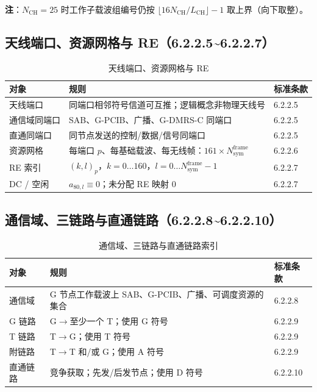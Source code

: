 \documentclass[11pt,a4paper]{ctexart}
\begin{document}
\textbf{注}：$N_{\mathrm{CH}}=25$ 时工作子载波组编号仍按 $\lfloor 16 N_{\mathrm{CH}}/L_{\mathrm{CH}} \rfloor - 1$ 取上界（向下取整）。

\subsection{天线端口、资源网格与 RE（6.2.2.5\textasciitilde 6.2.2.7）}

\begin{longtable}{lll}
\caption{天线端口、资源网格与 RE} \\
\toprule
\textbf{对象} & \textbf{规则} & \textbf{标准条款} \\
\midrule
天线端口 & 同端口相邻符号信道可互推；逻辑概念非物理天线号 & 6.2.2.5 \\
通信域同端口 & SAB、G-PCIB、广播、G-DMRS-C 同端口 & 6.2.2.5 \\
直通同端口 & 同节点发送的控制/数据/信号同端口 & 6.2.2.5 \\
资源网格 & 每端口 $p$、每基础载波、每无线帧：$161 \times N_{\mathrm{sym}}^{\mathrm{frame}}$ & 6.2.2.6 \\
RE 索引 & $(k,l)_p$，$k{=}0{\ldots}160$，$l{=}0{\ldots}N_{\mathrm{sym}}^{\mathrm{frame}}{-}1$ & 6.2.2.7 \\
DC / 空闲 & $a_{80,l}\equiv 0$；未分配 RE 映射 0 & 6.2.2.7 \\
\bottomrule
\end{longtable}

\subsection{通信域、三链路与直通链路（6.2.2.8\textasciitilde 6.2.2.10）}

\begin{longtable}{lll}
\caption{通信域、三链路与直通链路索引} \\
\toprule
\textbf{对象} & \textbf{规则} & \textbf{标准条款} \\
\midrule
通信域 & G 节点工作载波上 SAB、G-PCIB、广播、可调度资源的集合 & 6.2.2.8 \\
G 链路 & G$\rightarrow$至少一个 T；使用 G 符号 & 6.2.2.9 \\
T 链路 & T$\rightarrow$G；使用 T 符号 & 6.2.2.9 \\
附链路 & T$\rightarrow$T 和/或 G；使用 A 符号 & 6.2.2.9 \\
直通链路 & 竞争获取；先发/后发节点；使用 D 符号 & 6.2.2.10 \\
\bottomrule
\end{longtable}
\end{document}
